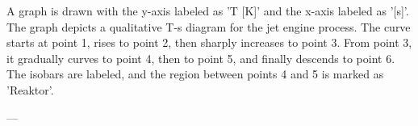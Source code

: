 A graph is drawn with the y-axis labeled as 'T [K]' and the x-axis labeled as '[s]'. The graph depicts a qualitative T-s diagram for the jet engine process. The curve starts at point 1, rises to point 2, then sharply increases to point 3. From point 3, it gradually curves to point 4, then to point 5, and finally descends to point 6. The isobars are labeled, and the region between points 4 and 5 is marked as 'Reaktor'.

---